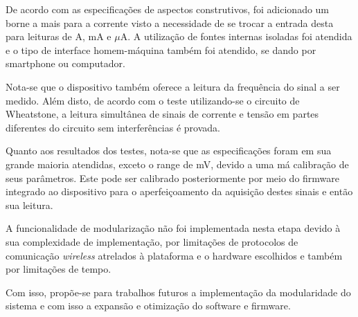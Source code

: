 De acordo com as especificações de aspectos construtivos, foi adicionado um borne a mais para a corrente visto a necessidade de se trocar a entrada desta para leituras de A, mA e $\mu$A. A utilização de fontes internas isoladas foi atendida e o tipo de interface homem-máquina também foi atendido, se dando por smartphone ou computador.

Nota-se que o dispositivo também oferece a leitura da frequência do sinal a ser medido. Além disto, de acordo com o teste utilizando-se o circuito de Wheatstone, a leitura simultânea de sinais de corrente e tensão em partes diferentes do circuito sem interferências é provada.

Quanto aos resultados dos testes, nota-se que as especificações foram em sua grande maioria atendidas, exceto o range de mV, devido a uma má calibração de seus parâmetros. Este pode ser calibrado posteriormente por meio do firmware integrado ao dispositivo para o aperfeiçoamento da aquisição destes sinais e então sua leitura.

A funcionalidade de modularização não foi implementada nesta etapa devido à sua complexidade de implementação, por limitações de protocolos de comunicação \textit{wireless} atrelados à plataforma e o hardware escolhidos e também por limitações de tempo. 

Com isso, propõe-se para trabalhos futuros a implementação da modularidade do sistema e com isso a expansão e otimização do software e firmware.